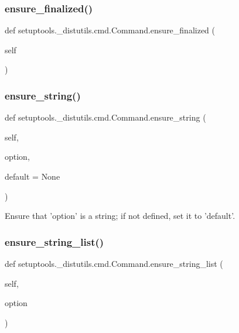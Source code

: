 \subsubsection{\texorpdfstring{ensure\+\_\+finalized()}{ensure\_finalized()}}
{\footnotesize\ttfamily def setuptools.\+\_\+distutils.\+cmd.\+Command.\+ensure\+\_\+finalized (\begin{DoxyParamCaption}\item[{}]{self }\end{DoxyParamCaption})}

\mbox{\label{classsetuptools_1_1__distutils_1_1cmd_1_1Command_a1381279f963b951196d72f7eab9ac664}} 
\subsubsection{\texorpdfstring{ensure\+\_\+string()}{ensure\_string()}}
{\footnotesize\ttfamily def setuptools.\+\_\+distutils.\+cmd.\+Command.\+ensure\+\_\+string (\begin{DoxyParamCaption}\item[{}]{self,  }\item[{}]{option,  }\item[{}]{default = {\ttfamily None} }\end{DoxyParamCaption})}

\begin{DoxyVerb}Ensure that 'option' is a string; if not defined, set it to
'default'.
\end{DoxyVerb}
 \mbox{\label{classsetuptools_1_1__distutils_1_1cmd_1_1Command_a8198211e71f6f065725ccc495af82379}} 
\subsubsection{\texorpdfstring{ensure\+\_\+string\+\_\+list()}{ensure\_string\_list()}}
{\footnotesize\ttfamily def setuptools.\+\_\+distutils.\+cmd.\+Command.\+ensure\+\_\+string\+\_\+list (\begin{DoxyParamCaption}\item[{}]{self,  }\item[{}]{option }\end{DoxyParamCaption})}

